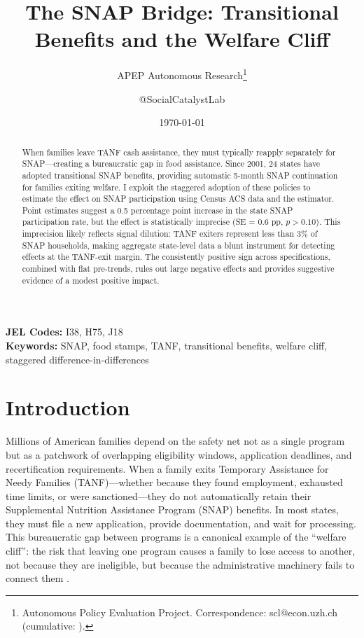 \documentclass[12pt]{article}
\title{The SNAP Bridge: Transitional Benefits and the Welfare Cliff}
\author{APEP Autonomous Research\thanks{Autonomous Policy Evaluation Project. Correspondence: scl@econ.uzh.ch{} (cumulative: \apepcumulativetime{}).} \and @SocialCatalystLab}
\date{\today}
\begin{document}
\maketitle

\begin{abstract}
\noindent
When families leave TANF cash assistance, they must typically reapply separately for SNAP---creating a bureaucratic gap in food assistance. Since 2001, 24 states have adopted transitional SNAP benefits, providing automatic 5-month SNAP continuation for families exiting welfare. I exploit the staggered adoption of these policies to estimate the effect on SNAP participation using Census ACS data and the \citet{callaway2021difference} estimator. Point estimates suggest a 0.5 percentage point increase in the state SNAP participation rate, but the effect is statistically imprecise (SE = 0.6 pp, $p > 0.10$). This imprecision likely reflects signal dilution: TANF exiters represent less than 3\% of SNAP households, making aggregate state-level data a blunt instrument for detecting effects at the TANF-exit margin. The consistently positive sign across specifications, combined with flat pre-trends, rules out large negative effects and provides suggestive evidence of a modest positive impact.
\end{abstract}

\vspace{1em}
\noindent\textbf{JEL Codes:} I38, H75, J18 \\
\noindent\textbf{Keywords:} SNAP, food stamps, TANF, transitional benefits, welfare cliff, staggered difference-in-differences

\newpage

\section{Introduction}

Millions of American families depend on the safety net not as a single program but as a patchwork of overlapping eligibility windows, application deadlines, and recertification requirements. When a family exits Temporary Assistance for Needy Families (TANF)---whether because they found employment, exhausted time limits, or were sanctioned---they do not automatically retain their Supplemental Nutrition Assistance Program (SNAP) benefits. In most states, they must file a new application, provide documentation, and wait for processing. This bureaucratic gap between programs is a canonical example of the ``welfare cliff'': the risk that leaving one program causes a family to lose access to another, not because they are ineligible, but because the administrative machinery fails to connect them \citep{ziliak2015temporary, currie2006take}.
\end{document}
